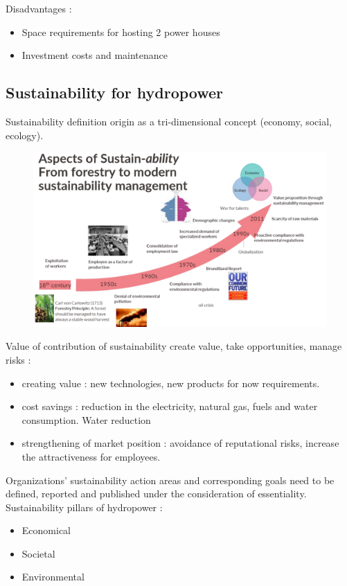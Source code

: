 \documentclass[../main.tex]{subfiles}
\begin{document}
Disadvantages : \begin{itemize}
    \item Space requirements for hosting 2 power houses
    \item Investment costs and maintenance
\end{itemize}

\subsection{Sustainability for hydropower}
Sustainability definition origin as a tri-dimensional concept (economy, social, ecology). \\

\begin{figure}[hbt!]
    \centering
    \includegraphics[width=0.8\linewidth]{IMAGES/Hydraulic/Screenshot from 2024-11-20 14-23-43.png}
\end{figure}

Value of contribution of sustainability create value, take opportunities, manage risks : \begin{itemize}
    \item creating value : new technologies, new products for now requirements.
    \item cost savings : reduction in the electricity, natural gas, fuels and water consumption. Water reduction
    \item strengthening of market position : avoidance of reputational risks, increase the attractiveness for employees.
\end{itemize}
Organizations' sustainability action areas and corresponding goals need to be defined, reported and published under the consideration of essentiality.\\

Sustainability pillars of hydropower : \begin{itemize}
    \item Economical
    \item Societal
    \item Environmental
\end{itemize}
\end{document}
